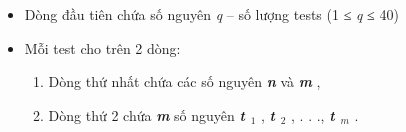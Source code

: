 \begin{itemize}
	\item 

Dòng đầu tiên chứa số nguyên \emph{ q } – số lượng tests (1 ≤ \emph{ q } ≤ 40)
	\item Mỗi test cho trên 2 dòng:
\begin{enumerate}
	\item Dòng thứ nhất chứa các số nguyên \textbf{\emph{ n }} và \textbf{\emph{ m }} ,
	\item Dòng thứ 2 chứa \textbf{\emph{ m }} số nguyên \textbf{\emph{ t $_ 1 $}} , \textbf{\emph{ t $_ 2 $}} , . . ., \textbf{\emph{ t $_ m $}} .
\end{enumerate}
\end{itemize}